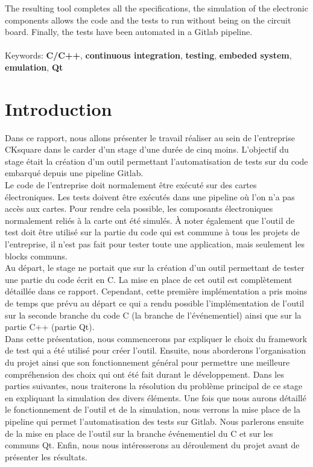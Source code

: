 \documentclass[a4paper]{article}
\begin{document}
The resulting tool completes all the specifications, the simulation of the
electronic components allows the code and the tests to run without being on the
circuit board. Finally, the tests have been automated in a Gitlab pipeline.
\\~\\

\noindent
Keywords: \textbf{C/C++}, \textbf{continuous integration}, \textbf{testing},
\textbf{embeded system}, \textbf{emulation}, \textbf{Qt}

\clearpage{}

\pagestyle{plain}
\setcounter{page}{1}
\clearpage
\section*{Introduction}

Dans ce rapport, nous allons présenter le travail réaliser au sein de
l'entreprise CKsquare dans le carder d'un stage d'une durée de cinq moins.
L'objectif du stage était la création d'un outil permettant l'automatisation de
tests sur du code embarqué depuis une pipeline Gitlab.\\

Le code de l'entreprise doit normalement être exécuté sur des cartes
électroniques. Les tests doivent être exécutés dans une pipeline où l'on n'a pas
accès aux cartes. Pour rendre cela possible, les composants électroniques
normalement reliés à la carte ont été simulés. À noter également que l'outil de
test doit être utilisé sur la partie du code qui est commune à tous les projets
de l'entreprise, il n'est pas fait pour tester toute une application, mais
seulement les blocks communs.\\

Au départ, le stage ne portait que sur la création d'un outil permettant de
tester une partie du code écrit en C. La mise en place de cet outil est
complètement détaillée dans ce rapport. Cependant, cette première implémentation
a pris moins de temps que prévu au départ ce qui a rendu possible
l'implémentation de l'outil sur la seconde branche du code C (la branche
de l'événementiel) ainsi que sur la partie C++ (partie Qt).\\

Dans cette présentation, nous commencerons par expliquer le choix du framework
de test qui a été utilisé pour créer l'outil. Ensuite, nous aborderons
l'organisation du projet ainsi que son fonctionnement général pour permettre une meilleure
compréhension des choix qui ont été fait durant le développement.
Dans les parties suivantes, nous traiterons la résolution du problème principal
de ce stage en expliquant la simulation des divers éléments. Une fois que nous
aurons détaillé le fonctionnement de l'outil et de la simulation, nous verrons
la mise place de la pipeline qui permet l'automatisation des tests sur Gitlab.
Nous parlerons ensuite de la mise en place de l'outil sur la branche événementiel
du C et sur les communs Qt. Enfin, nous nous intéresserons au déroulement du
projet avant de présenter les résultats.
\end{document}
